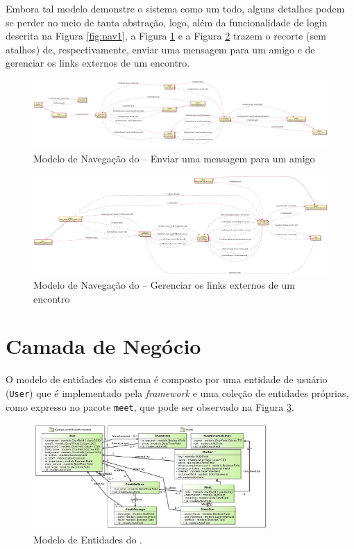 Embora tal modelo demonstre o sistema como um todo, alguns detalhes podem se perder no meio de tanta abstração, logo, além da funcionalidade de login descrita na Figura \ref{fig:nav1}, a Figura \ref{fig:nav7} e a Figura \ref{fig:nav8} trazem o recorte (sem atalhos) de, respectivamente, enviar uma mensagem para um amigo e de gerenciar os links externos de um encontro.

\begin{figure}[H]
	\centering
	\includegraphics[scale=0.175]{figuras/navspecial1.png}
	\caption{Modelo de Navegação do \imprimirtitulo{} -- Enviar uma mensagem para um amigo}
	\label{fig:nav7}
\end{figure}

\begin{figure}[H]
	\centering
	\includegraphics[scale=0.175]{figuras/navspecial2.png}
	\caption{Modelo de Navegação do \imprimirtitulo{} -- Gerenciar os links externos de um encontro}
	\label{fig:nav8}
\end{figure}


\section{Camada de Negócio}
\label{sec-arquitetura-negocio}


O modelo de entidades do sistema é composto por uma entidade de usuário (\texttt{User}) que é implementado pela \textit{framework} e uma coleção de entidades próprias, como expresso no pacote \texttt{meet}, que pode ser observado na Figura \ref{fig:ent}.

\begin{figure}[H]
	\centering
	\includegraphics[width=0.8\textwidth]{figuras/FrameWebEntityModel.jpg}
	\caption{Modelo de Entidades do \imprimirtitulo.}
	\label{fig:ent}
\end{figure}

